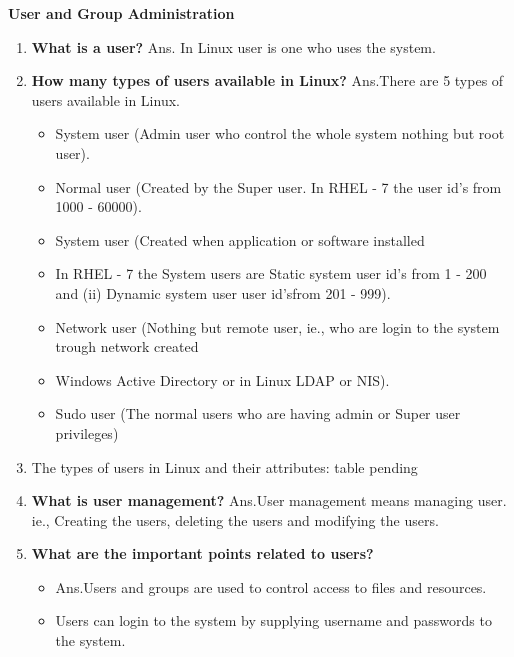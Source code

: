 \item \textbf {User and Group Administration}
\begin{enumerate}
    \item \textbf {What is a user?}\newline
    Ans. In Linux user is one who uses the system. 
\bigskip
\bigskip
    \item \textbf {How many types of users available in Linux?}\newline
    Ans.There are 5 types of users available in Linux.
     \begin{itemize}
    \item System user   (Admin user who control the whole system nothing but root user).
    \item Normal user  (Created by the Super user. In RHEL - 7 the user id's from 1000 - 60000).
    \item System user   (Created when application or software installed 
    \item In RHEL - 7 the System users are\newline
    Static system user id's from 1 - 200 and \newline
    (ii) Dynamic system user user id'sfrom 201 - 999).\newline
    \item Network user   (Nothing but remote user, ie., who are login to the system trough network  created
    \item Windows Active Directory or in Linux LDAP or NIS). 
    \item Sudo user   (The normal users who are having admin or Super user privileges)
    \end{itemize}
    \item The types of users in Linux and their attributes:\newline
    table pending
    \item \textbf { What is user management?}\newline
    Ans.User management means managing user. ie., Creating the users, deleting the users and modifying the users.
    \bigskip
    \bigskip
    \item \textbf{What are the important points related to users?}
    \begin {itemize}
    \item Ans.Users and groups are used to control access to files and resources.\newline
    \item Users can login to the system by supplying username and passwords to the system.\newline

\end{itemize}
\end{enumerate}
